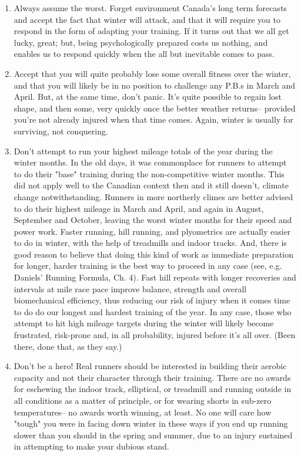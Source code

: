 \begin{enumerate}
    \item Always assume the worst. Forget environment Canada's long term forecasts and accept the fact that winter will attack, and that it will require you to respond in the form of adapting your training. If it turns out that we all get lucky, great; but, being psychologically prepared costs us nothing, and enables us to respond quickly when the all but inevitable comes to pass.

    \item Accept that you will quite probably lose some overall fitness over the winter, and that you will likely be in no position to challenge any P.B.s in March and April. But, at the same time, don't panic. It's quite possible to regain lost shape, and then some, very quickly once the better weather returns-- provided you're not already injured when that time comes. Again, winter is usually for surviving, not conquering.

    \item Don't attempt to run your highest mileage totals of the year during the winter months. In the old days, it was commonplace for runners to attempt to do their "base" training during the non-competitive winter months. This did not apply well to the Canadian context then and it still doesn't, climate change notwithstanding. Runners in more northerly climes are better advised to do their highest mileage in March and April, and again in August, September and October, leaving the worst winter months for their speed and power work. Faster running, hill running, and plyometrics are actually easier to do in winter, with the help of treadmills and indoor tracks. And, there is good reason to believe that doing this kind of work as immediate preparation for longer, harder training is the best way to proceed in any case (see, e.g. Daniels' Running Formula, Ch. 4). Fast hill repeats with longer recoveries and intervals at mile race pace improve balance, strength and overall biomechanical efficiency, thus reducing our risk of injury when it comes time to do do our longest and hardest training of the year. In any case, those who attempt to hit high mileage targets during the winter will likely become frustrated, risk-prone and, in all probability, injured before it's all over. (Been there, done that, as they say.)

    \item Don't be a hero! Real runners should be interested in building their aerobic capacity and not their character through their training. There are no awards for eschewing the indoor track, elliptical, or treadmill and running outside in all conditions as a matter of principle, or for wearing shorts in sub-zero temperatures-- no awards worth winning, at least. No one will care how "tough" you were in facing down winter in these ways if you end up running slower than you should in the spring and summer, due to an injury sustained in attempting to make your dubious stand.


\end{enumerate}
